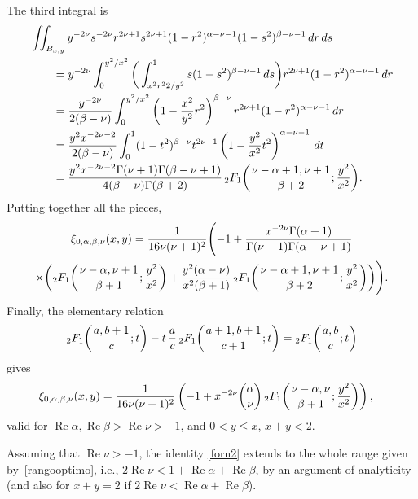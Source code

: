\documentclass[10pt,leqno,a4paper]{article}
\theoremstyle{plain}
\renewcommand{\Re}{\operatorname{Re}}
\numberwithin{equation}{section}
\newcommand{\FF}[3]{{}_{2}F_{1}%
  \mathopen{}\left(\genfrac{}{}{0pt}{}{#1}{#2};#3\right)\mathclose{}}
\begin{document}
The third integral is
\begin{align*}
   &\iint_{B_{x,y}} y^{-2\nu} s^{-2\nu} r^{2\nu+1} s^{2\nu+1} (1-r^2)^{\alpha-\nu-1}
   (1-s^2)^{\beta-\nu-1} \, dr \, ds
   \\
   &\qquad= y^{-2\nu} \int_0^{y^2/x^2}
   \bigg( \int_{x^2 r^2 2/y^2}^1 s(1-s^2)^{\beta-\nu-1} \, ds\bigg)
   r^{2\nu+1} (1-r^2)^{\alpha-\nu-1} \,dr
   \\
   &\qquad= \frac{y^{-2\nu}}{2(\beta-\nu)}
   \int_0^{y^2/x^2} \left(1-\frac{x^2}{y^2} r^2 \right)^{\beta-\nu}
   r^{2\nu+1} (1-r^2)^{\alpha-\nu-1} \, dr
   \\
   &\qquad= \frac{y^2 x^{-2\nu-2}}{2(\beta-\nu)}
   \int_0^1 (1-t^2)^{\beta-\nu} t^{2\nu+1} \left(1-\frac{y^2}{x^2} t^2\right)^{\alpha-\nu-1}
   \, dt
   \\
   &\qquad= \frac{y^2 x^{-2\nu-2} \Gamma(\nu+1) \Gamma(\beta-\nu+1)}
   {4(\beta-\nu) \Gamma(\beta+2)}
   \, \FF{\nu-\alpha+1,\nu+1}{\beta+2}{\frac{y^2}{x^2}}.
\end{align*}
Putting together all the pieces,
\begin{multline*}
   \xi_{0,\alpha,\beta,\nu}(x,y)
   = \frac{1}{16\nu (\nu+1)^2} \Bigg(
   {-1}
   + \frac{x^{-2\nu} \Gamma(\alpha+1)}{\Gamma(\nu+1) \Gamma(\alpha-\nu+1)}
   \\
   \times \bigg(\FF{\nu-\alpha,\nu+1}{\beta+1}{\frac{y^2}{x^2}}
   + \frac{y^2 (\alpha-\nu)}{x^2 (\beta+1)}
   \, \FF{\nu-\alpha+1,\nu+1}{\beta+2}{\frac{y^2}{x^2}}
   \bigg)
   \Bigg).
\end{multline*}
Finally, the elementary relation
\[
  \FF{a,b+1}{c}{t} - t \,\frac{a}{c} \, \FF{a+1,b+1}{c+1}{t}
   = \FF{a,b}{c}{t}
\]
gives
\begin{align}
\label{forn2}
   \xi_{0,\alpha,\beta,\nu}(x,y) &= \frac{1}{16\nu(\nu+1)^2}\left(
   -1
   + x^{-2\nu} \binom{\alpha}{\nu}
   \,
   \FF{\nu-\alpha,\nu}{\beta+1}{\frac{y^2}{x^2}}
   \right),
\end{align}
valid for $\Re \alpha, \Re \beta > \Re \nu > -1$, and $0 < y \leq x$, $x+y < 2$.

Assuming that $\Re \nu > -1$, the identity \eqref{forn2} extends to the whole range given by~\eqref{rangooptimo}, i.e., $2\Re \nu <1+\Re \alpha+\Re \beta$, by an argument of analyticity (and also for $x+y=2$ if $2\Re \nu <\Re \alpha+\Re \beta$).
\end{document}
